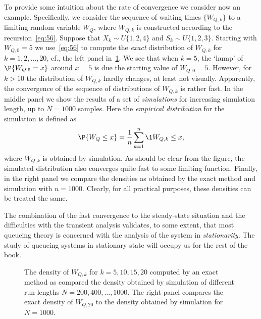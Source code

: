To provide some intuition about the rate of convergence we consider now an example.
Specifically, we consider the sequence of waiting times $\{W_{Q,k}\}$ to a limiting random variable $W_Q$, where $W_{Q,k}$ is constructed according to the recursion~\cref{eq:56}.
Suppose that $X_k\sim U\{1,2,4\}$ and $S_k\sim U\{1,2,3\}$.
Starting with $W_{Q,0}=5$ we use~\cref{eq:56} to compute the \emph{exact} distribution of $W_{Q,k}$ for $k=1,2,\ldots, 20$, cf., the left panel in~\cref{fig:convergence}.
We see that when $k=5$, the `hump' of $\P{W_{Q,5}=x}$ around $x=5$ is due the starting value of $W_{Q,0}=5$.
However, for $k>10$ the distribution of $W_{Q,k}$ hardly changes, at least not visually.
Apparently, the convergence of the sequence of distributions of $W_{Q,k}$ is rather fast.
In the middle panel we show the results of a set of \emph{simulations} for increasing simulation length, up to $N=1000$ samples.
Here the \emph{empirical distribution} for the simulation is defined as
\begin{equation*}
\P{W_Q\leq x} = \frac 1n \sum_{k=1}^n \1{W_{Q,k} \leq x},
\end{equation*}
where $W_{Q,k}$ is obtained by simulation.
As should be clear from the figure, the simulated distribution also converges quite fast to some limiting function.
Finally, in the right panel we compare the densities as obtained by the exact method and simulation with $n=1000$.
Clearly, for all practical purposes, these densities can be treated the same.

The combination of the fast convergence to the steady-state situation
and the difficulties with the transient analysis validates, to some
extent, that most queueing theory is concerned with the analysis of
the system in \emph{stationarity}. The study of queueing systems in
stationary state will occupy us for the rest of the book.

\begin{figure}
 \centering



 \caption{The density of $W_{Q,k}$ for $k=5, 10, 15, 20$ computed by
 an exact method as compared the density obtained by simulation of
 different run lengths $N=200, 400, \ldots, 1000$. The right panel
 compares the exact density of $W_{Q,20}$ to the density obtained by simulation
 for $N=1000$.}
\label{fig:convergence}
\end{figure}




